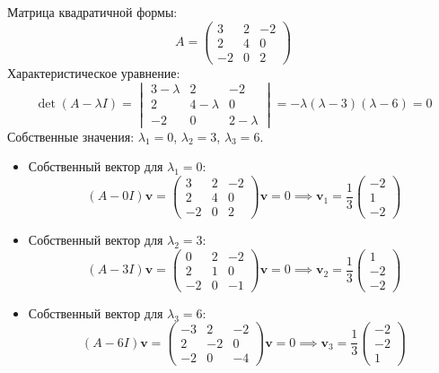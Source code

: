 \documentclass[a4paper]{article}
\begin{document}
\begin{enumerate}
\begin{enumerate}
    Матрица квадратичной формы:  
    \[
    A = \begin{pmatrix}
    3 & 2 & -2 \\
    2 & 4 & 0 \\
    -2 & 0 & 2
    \end{pmatrix}
    \]  
    Характеристическое уравнение:  
    \[
    \det(A - \lambda I) = \begin{vmatrix}
    3-\lambda & 2 & -2 \\
    2 & 4-\lambda & 0 \\
    -2 & 0 & 2-\lambda
    \end{vmatrix} = -\lambda(\lambda - 3)(\lambda - 6) = 0
    \]  
    Собственные значения: \(\lambda_1 = 0\), \(\lambda_2 = 3\), \(\lambda_3 = 6\).  
    \begin{itemize}
      \item Собственный вектор для \(\lambda_1 = 0\):  
      \[
      (A - 0I)\mathbf{v} = \begin{pmatrix}
      3 & 2 & -2 \\
      2 & 4 & 0 \\
      -2 & 0 & 2
      \end{pmatrix} \mathbf{v} = 0 \implies \mathbf{v}_1 = \frac{1}{3} \begin{pmatrix} -2 \\ 1 \\ -2 \end{pmatrix}
      \]  
      
      \item Собственный вектор для \(\lambda_2 = 3\):  
      \[
      (A - 3I)\mathbf{v} = \begin{pmatrix}
      0 & 2 & -2 \\
      2 & 1 & 0 \\
      -2 & 0 & -1
      \end{pmatrix} \mathbf{v} = 0 \implies \mathbf{v}_2 = \frac{1}{3} \begin{pmatrix} 1 \\ -2 \\ -2 \end{pmatrix}
      \]  

      \item Собственный вектор для \(\lambda_3 = 6\):  
      \[
      (A - 6I)\mathbf{v} = \begin{pmatrix}
      -3 & 2 & -2 \\
      2 & -2 & 0 \\
      -2 & 0 & -4
      \end{pmatrix} \mathbf{v} = 0 \implies \mathbf{v}_3 = \frac{1}{3} \begin{pmatrix} -2 \\ -2 \\ 1 \end{pmatrix}
      \]  
    \end{itemize}


\end{enumerate}
\end{enumerate}
\end{document}
